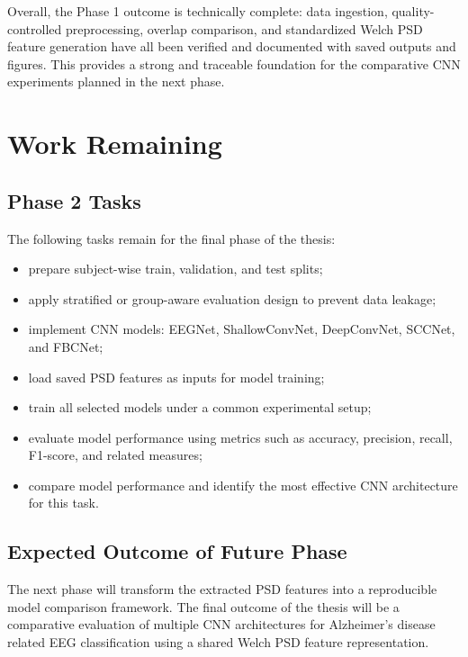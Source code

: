 \documentclass[12pt,a4paper]{article}
\begin{document}
Overall, the Phase 1 outcome is technically complete: data ingestion, quality-controlled preprocessing, overlap comparison, and standardized Welch PSD feature generation have all been verified and documented with saved outputs and figures. This provides a strong and traceable foundation for the comparative CNN experiments planned in the next phase.

\newpage

\section{Work Remaining}

\subsection{Phase 2 Tasks}
The following tasks remain for the final phase of the thesis:
\begin{itemize}
    \item prepare subject-wise train, validation, and test splits;
    \item apply stratified or group-aware evaluation design to prevent data leakage;
    \item implement CNN models: EEGNet, ShallowConvNet, DeepConvNet, SCCNet, and FBCNet;
    \item load saved PSD features as inputs for model training;
    \item train all selected models under a common experimental setup;
    \item evaluate model performance using metrics such as accuracy, precision, recall, F1-score, and related measures;
    \item compare model performance and identify the most effective CNN architecture for this task.
\end{itemize}

\subsection{Expected Outcome of Future Phase}
The next phase will transform the extracted PSD features into a reproducible model comparison framework. The final outcome of the thesis will be a comparative evaluation of multiple CNN architectures for Alzheimer’s disease related EEG classification using a shared Welch PSD feature representation.

\newpage
\end{document}
